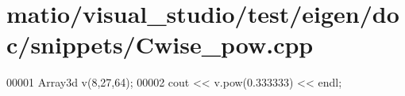 \hypertarget{matio_2visual__studio_2test_2eigen_2doc_2snippets_2_cwise__pow_8cpp_source}{}\section{matio/visual\+\_\+studio/test/eigen/doc/snippets/\+Cwise\+\_\+pow.cpp}
\label{matio_2visual__studio_2test_2eigen_2doc_2snippets_2_cwise__pow_8cpp_source}

\begin{DoxyCode}
00001 Array3d v(8,27,64);
00002 cout << v.pow(0.333333) << endl;
\end{DoxyCode}
